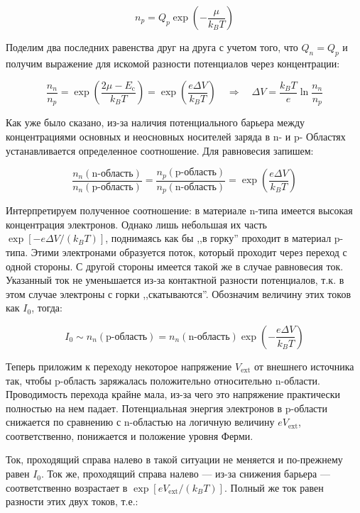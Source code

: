 \documentclass[a4paper, 12pt]{article}
\newcommand{\qrq}
{\ensuremath{\quad \Rightarrow \quad}} %
\begin{document}
\begin{equation}
	n_p = Q_p \exp\left(-\frac{\mu}{k_B T}\right)
\end{equation}

Поделим два последних равенства друг на друга с учетом того, что $Q_n = Q_p$ и получим выражение для искомой разности потенциалов через концентрации:

\begin{equation}
	\frac{n_n}{n_p} = \exp\left(\frac{2\mu - E_\text{c}}{k_B T}\right) = \exp\left(\frac{e \Delta V}{k_B T}\right) \qrq \Delta V = \frac{k_B T}{e} \ln \frac{n_n}{n_p}
\end{equation}

Как уже было сказано, из-за наличия потенциального барьера между концентрациями основных и неосновных носителей заряда в n- и p- Областях устанавливается определенное соотношение. Для равновесия запишем:

\begin{equation}
	\frac{n_n(\text{n-область})}{n_n(\text{p-область})} = \frac{n_p(\text{p-область})}{n_p(\text{n-область})} = \exp\left(\frac{e \Delta V}{k_B T}\right)
\end{equation}

Интерпретируем полученное соотношение: в материале n-типа имеется высокая концентрация электронов. Однако лишь небольшая их часть $\exp\left[-e\Delta V / (k_B T)\right]$, поднимаясь как бы ,,в горку'' проходит в материал p-типа. Этими электронами образуется поток, который проходит через переход с одной стороны. С другой стороны имеется такой же в случае равновесия ток. Указанный ток не уменьшается из-за контактной разности потенциалов, т.к. в этом случае электроны с горки ,,скатываются''. Обозначим величину этих токов как $I_0$, тогда:

\begin{equation}
	I_0 \sim n_n(\text{p-область}) = n_n(\text{n-область})\exp\left(-\frac{e\Delta V}{k_B T}\right)
	\label{eq:2_I}
\end{equation}

Теперь приложим к переходу некоторое напряжение $V_\text{ext}$ от внешнего источника так, чтобы p-область заряжалась положительно относительно n-области. Проводимость перехода крайне мала, из-за чего это напряжение практически полностью на нем падает. Потенциальная энергия электронов в p-области снижается по сравнению с n-областью на логичную величину $eV_{\text{ext}}$, соответственно, понижается и положение уровня Ферми.

Ток, проходящий справа налево в такой ситуации не меняется и по-прежнему равен $I_0$. Ток же, проходящий справа налево --- из-за снижения барьера --- соответственно возрастает в $\exp[eV_{\text{ext}} / (k_B T)]$. Полный же ток равен разности этих двух токов, т.е.:
\end{document}

